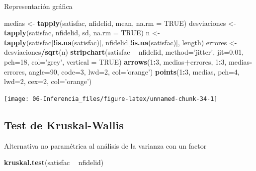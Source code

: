 \documentclass[]{book}
\newenvironment{Shaded}{\begin{snugshade}}{\end{snugshade}}
\newcommand{\KeywordTok}[1]{\textcolor[rgb]{0.13,0.29,0.53}{\textbf{#1}}}
\newcommand{\DataTypeTok}[1]{\textcolor[rgb]{0.13,0.29,0.53}{#1}}
\newcommand{\DecValTok}[1]{\textcolor[rgb]{0.00,0.00,0.81}{#1}}
\newcommand{\FloatTok}[1]{\textcolor[rgb]{0.00,0.00,0.81}{#1}}
\newcommand{\StringTok}[1]{\textcolor[rgb]{0.31,0.60,0.02}{#1}}
\newcommand{\OtherTok}[1]{\textcolor[rgb]{0.56,0.35,0.01}{#1}}
\newcommand{\OperatorTok}[1]{\textcolor[rgb]{0.81,0.36,0.00}{\textbf{#1}}}
\newcommand{\NormalTok}[1]{#1}
\begin{document}
Representación gráfica

\begin{Shaded}
\begin{Highlighting}[]
\NormalTok{medias <-}\StringTok{ }\KeywordTok{tapply}\NormalTok{(satisfac, nfidelid, mean, }\DataTypeTok{na.rm =} \OtherTok{TRUE}\NormalTok{)}
\NormalTok{desviaciones <-}\StringTok{ }\KeywordTok{tapply}\NormalTok{(satisfac, nfidelid, sd, }\DataTypeTok{na.rm =} \OtherTok{TRUE}\NormalTok{)}
\NormalTok{n <-}\StringTok{ }\KeywordTok{tapply}\NormalTok{(satisfac[}\OperatorTok{!}\KeywordTok{is.na}\NormalTok{(satisfac)], nfidelid[}\OperatorTok{!}\KeywordTok{is.na}\NormalTok{(satisfac)], length)}
\NormalTok{errores <-}\StringTok{ }\NormalTok{desviaciones}\OperatorTok{/}\KeywordTok{sqrt}\NormalTok{(n)}
\KeywordTok{stripchart}\NormalTok{(satisfac }\OperatorTok{~}\StringTok{ }\NormalTok{nfidelid, }\DataTypeTok{method=}\StringTok{'jitter'}\NormalTok{, }\DataTypeTok{jit=}\FloatTok{0.01}\NormalTok{, }\DataTypeTok{pch=}\DecValTok{18}\NormalTok{, }\DataTypeTok{col=}\StringTok{'grey'}\NormalTok{, }\DataTypeTok{vertical =} \OtherTok{TRUE}\NormalTok{)}
\KeywordTok{arrows}\NormalTok{(}\DecValTok{1}\OperatorTok{:}\DecValTok{3}\NormalTok{, medias}\OperatorTok{+}\NormalTok{errores, }\DecValTok{1}\OperatorTok{:}\DecValTok{3}\NormalTok{, medias}\OperatorTok{-}\NormalTok{errores, }\DataTypeTok{angle=}\DecValTok{90}\NormalTok{, }\DataTypeTok{code=}\DecValTok{3}\NormalTok{, }\DataTypeTok{lwd=}\DecValTok{2}\NormalTok{, }\DataTypeTok{col=}\StringTok{'orange'}\NormalTok{)}
\KeywordTok{points}\NormalTok{(}\DecValTok{1}\OperatorTok{:}\DecValTok{3}\NormalTok{, medias, }\DataTypeTok{pch=}\DecValTok{4}\NormalTok{, }\DataTypeTok{lwd=}\DecValTok{2}\NormalTok{, }\DataTypeTok{cex=}\DecValTok{2}\NormalTok{, }\DataTypeTok{col=}\StringTok{'orange'}\NormalTok{)}
\end{Highlighting}
\end{Shaded}

\begin{center}\texttt{[image: 06-Inferencia\_files/figure-latex/unnamed-chunk-34-1]} \end{center}

\subsection{Test de Kruskal-Wallis}\label{test-de-kruskal-wallis}

Alternativa no paramétrica al análisis de la varianza con un factor

\begin{Shaded}
\begin{Highlighting}[]
\KeywordTok{kruskal.test}\NormalTok{(satisfac }\OperatorTok{~}\StringTok{ }\NormalTok{nfidelid)}
\end{Highlighting}
\end{Shaded}
\end{document}

